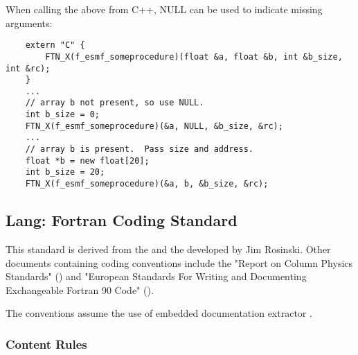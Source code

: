 When calling the above from C++, NULL can be used to indicate missing arguments:

\begin{verbatim}
    extern "C" {
        FTN_X(f_esmf_someprocedure)(float &a, float &b, int &b_size, int &rc);
    }
    ...
    // array b not present, so use NULL.
    int b_size = 0;
    FTN_X(f_esmf_someprocedure)(&a, NULL, &b_size, &rc);
    ...
    // array b is present.  Pass size and address.
    float *b = new float[20];
    int b_size = 20;
    FTN_X(f_esmf_someprocedure)(&a, b, &b_size, &rc);
\end{verbatim}

\subsection{Lang: Fortran Coding Standard}
\label{sec:code_conv_cam}

This standard is derived from the  and the
developed by Jim Rosinski. Other documents containing coding
conventions include the "Report on Column Physics Standards"
()
and "European Standards For Writing and Documenting Exchangeable
Fortran 90 Code"
().

The conventions assume the use of embedded documentation extractor
.

\subsubsection{Content Rules}

